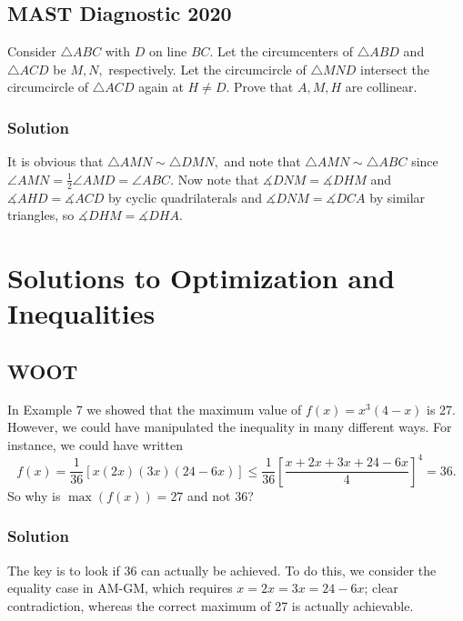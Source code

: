\documentclass[blue,onecol]{shooting}
\begin{document}
\section{MAST Diagnostic 2020}

Consider $\triangle ABC$ with $D$ on line $BC.$ Let the circumcenters of $\triangle ABD$ and $\triangle ACD$ be $M,N,$ respectively. Let the circumcircle of $\triangle MND$ intersect the circumcircle of $\triangle ACD$ again at $H\neq D.$ Prove that $A,M,H$ are collinear.

\subsection{Solution}

It is obvious that $\triangle AMN\sim \triangle DMN,$ and note that $\triangle AMN\sim\triangle ABC$ since $\angle AMN=\frac{1}{2}\angle AMD=\angle ABC.$ Now note that $\measuredangle DNM=\measuredangle DHM$ and $\measuredangle AHD=\measuredangle ACD$ by cyclic quadrilaterals and $\measuredangle DNM=\measuredangle DCA$ by similar triangles, so $\measuredangle DHM=\measuredangle DHA.$

\chapter{Solutions to Optimization and Inequalities}














\section{WOOT}

In Example 7 we showed that the maximum value of $f(x)=x^3(4-x)$ is 27. However, we could have manipulated the inequality in many different ways. For instance, we could have written \[f(x)=\frac 1{36}[x(2x)(3x)(24-6x)]\le\frac1{36}\left[\frac{x+2x+3x+24-6x}4\right]^4=36.\] So why is $\max(f(x))=27$ and not 36?

\subsection{Solution}

The key is to look if 36 can actually be achieved. To do this, we consider the equality case in AM-GM, which requires $x=2x=3x=24-6x$; clear contradiction, whereas the correct maximum of 27 is actually achievable. 
\end{document}
